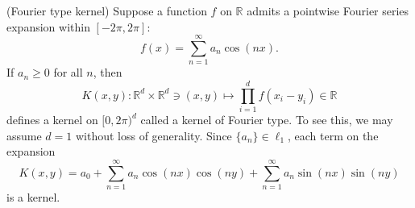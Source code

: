 \documentclass[a4paper,12pt]{article}
\begin{document}
\begin{ex} (Fourier type kernel) \label{ex Fourier kernel}
	Suppose a function \( f \) on \( \mathbb{R} \) admits a pointwise Fourier series expansion within \( [-2 \pi, 2 \pi] \):
	\[
		f(x) = \sum_{n=1}^{\infty} a_n \cos (nx).
	\]
	If \( a_n \ge 0 \) for all \( n \), then
	\[
		K(x,y) : \mathbb{R}^d \times \mathbb{R}^d \ni (x,y)
		\mapsto \prod_{i=1}^{d} f(x_i- y_i) \in \mathbb{R}
	\]
	defines a kernel on \( [0,2 \pi)^{d} \) called a kernel of Fourier type.
	To see this, we may assume \( d= 1 \) without loss of generality. Since \( \{a_n\} \in \ell_1 \), each term on the expansion
	\[
		K(x,y) = a_0 + \sum_{n=1}^{\infty} a_n \cos (nx) \cos(ny) + \sum_{n=1}^{\infty} a_n \sin (nx) \sin (ny)
	\]
	is a kernel.
	\fin\end{ex}
\end{document}
